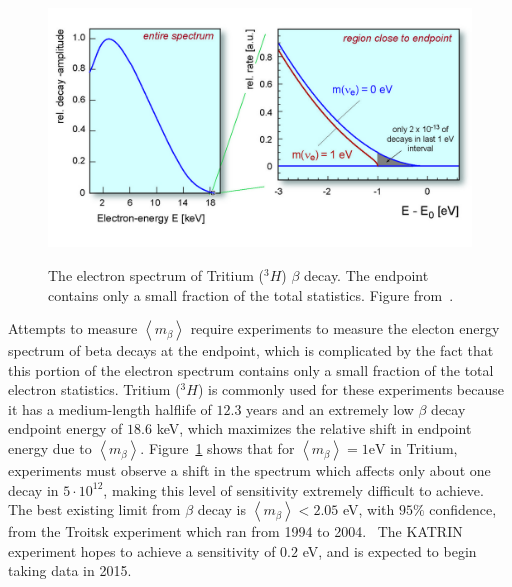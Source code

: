 \begin{figure}
\begin{center}
\includegraphics[keepaspectratio=true,width=\textwidth]{TritiumSpectrum.jpg}
\end{center}
\renewcommand{\baselinestretch}{1}
\small\normalsize
\begin{quote}
\caption{The electron spectrum of Tritium ($^3H$) $\beta$ decay.  The endpoint contains only a small fraction of the total statistics.  Figure from~\cite{Angrik:2005ep}.}
\label{fig:TritiumSpectrum}
\end{quote}
\end{figure}
\renewcommand{\baselinestretch}{2}
\small\normalsize

Attempts to measure $\left< m_\beta \right>$ require experiments to measure the electon energy spectrum of beta decays at the endpoint, which is complicated by the fact that this portion of the electron spectrum contains only a small fraction of the total electron statistics.  Tritium ($^3H$) is commonly used for these experiments because it has a medium-length halflife of $12.3$ years and an extremely low $\beta$ decay endpoint energy of $18.6$ keV, which maximizes the relative shift in endpoint energy due to $\left< m_\beta \right>$.  Figure~\ref{fig:TritiumSpectrum} shows that for $\left< m_\beta \right> = 1\text{eV}$ in Tritium, experiments must observe a shift in the spectrum which affects only about one decay in $5 \cdot 10^{12}$, making this level of sensitivity extremely difficult to achieve.  The best existing limit from $\beta$ decay is $\left<m_\beta\right> < 2.05$ eV, with $95\%$ confidence, from the Troitsk experiment which ran from 1994 to 2004.~\cite{OldTritium}  The KATRIN experiment hopes to achieve a sensitivity of $0.2$ eV, and is expected to begin taking data in 2015.~\cite{NewTritium,NewTritiumTimeline}

